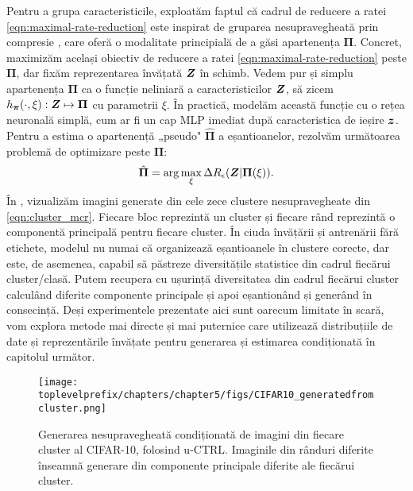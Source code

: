 \documentclass[../../book-main_ro.tex]{subfiles}
\begin{document}
Pentru a grupa caracteristicile, exploatăm faptul că cadrul de reducere a ratei \eqref{eqn:maximal-rate-reduction} este inspirat de gruparea nesupravegheată prin compresie \cite{ma2007segmentation}, care oferă o modalitate principială de a găsi apartenența $\bm \Pi$.
Concret, maximizăm același obiectiv de reducere a ratei \eqref{eqn:maximal-rate-reduction} peste $\bm \Pi$, dar fixăm reprezentarea învățată $\bm{Z}$ în schimb. Vedem pur și simplu apartenența $\bm \Pi$ ca o funcție neliniară a caracteristicilor $\bm{Z}$, să zicem $h_{\bm \pi}(\cdot,\xi):\bm{Z} \mapsto \bm \Pi$ cu parametrii $\xi$. În practică, modelăm această funcție cu o rețea neuronală simplă, cum ar fi un cap MLP imediat după caracteristica de ieșire $\bm{z}$.
Pentru a estima o apartenență „pseudo" $\hat{\bm \Pi}$ a eșantioanelor, rezolvăm următoarea problemă de optimizare peste $\bm \Pi$:
\begin{align}
    \hat{\bm \Pi} = \arg\max_{\xi} \Delta R_\epsilon(\bm{Z}| \bm \Pi(\xi)).
\label{eqn:cluster_mcr}
\end{align}
În , vizualizăm imagini generate din cele zece clustere nesupravegheate din \eqref{eqn:cluster_mcr}. Fiecare bloc reprezintă un cluster și fiecare rând reprezintă o componentă principală pentru fiecare cluster. În ciuda învățării și antrenării fără etichete, modelul nu numai că organizează eșantioanele în clustere corecte, dar este, de asemenea, capabil să păstreze diversitățile statistice din cadrul fiecărui cluster/clasă. Putem recupera cu ușurință diversitatea din cadrul fiecărui cluster calculând diferite componente principale și apoi eșantionând și generând în consecință. Deși experimentele prezentate aici sunt oarecum limitate în scară, vom explora metode mai directe și mai puternice care utilizează distribuțiile de date și reprezentările învățate pentru generarea și estimarea condiționată în capitolul următor.
\begin{figure}[t]
    \footnotesize
    \centering
    \texttt{[image: \\toplevelprefix/chapters/chapter5/figs/CIFAR10\_generatedfromcluster.png]}
    \caption{\small Generarea nesupravegheată condiționată de imagini din fiecare cluster al CIFAR-10, folosind u-CTRL. Imaginile din rânduri diferite înseamnă generare din componente principale diferite ale fiecărui cluster.}
    \label{fig:vis_clustering}
\end{figure}
\end{document}
